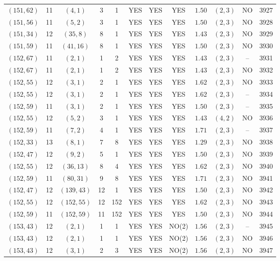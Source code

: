 \begin{longtable}{|c|c|c|c|c|c|c|c|c|c|c|c|}
$(151,62)$ & 11 & $(4,1)$ & 3 & 1 & YES & YES & YES & $1.50$ & $(2,3)$ & NO & 3927\\
$(151,56)$ & 11 & $(5,2)$ & 3 & 1 & YES & YES & YES & $1.50$ & $(2,3)$ & NO & 3928\\
$(151,34)$ & 12 & $(35,8)$ & 8 & 1 & YES & YES & YES & $1.43$ & $(2,3)$ & NO & 3929\\
$(151,59)$ & 11 & $(41,16)$ & 8 & 1 & YES & YES & YES & $1.50$ & $(2,3)$ & NO & 3930\\
$(152,67)$ & 11 & $(2,1)$ & 1 & 2 & YES & YES & YES & $1.43$ & $(2,3)$ & -- & 3931\\
$(152,67)$ & 11 & $(2,1)$ & 1 & 2 & YES & YES & YES & $1.43$ & $(2,3)$ & NO & 3932\\
$(152,55)$ & 12 & $(3,1)$ & 2 & 1 & YES & YES & YES & $1.62$ & $(2,3)$ & NO & 3933\\
$(152,55)$ & 12 & $(3,1)$ & 2 & 1 & YES & YES & YES & $1.62$ & $(2,3)$ & -- & 3934\\
$(152,59)$ & 11 & $(3,1)$ & 2 & 1 & YES & YES & YES & $1.50$ & $(2,3)$ & -- & 3935\\
$(152,55)$ & 12 & $(5,2)$ & 3 & 1 & YES & YES & YES & $1.43$ & $(4,2)$ & NO & 3936\\
$(152,59)$ & 11 & $(7,2)$ & 4 & 1 & YES & YES & YES & $1.71$ & $(2,3)$ & -- & 3937\\
$(152,33)$ & 13 & $(8,1)$ & 7 & 8 & YES & YES & YES & $1.29$ & $(2,3)$ & NO & 3938\\
$(152,47)$ & 12 & $(9,2)$ & 5 & 1 & YES & YES & YES & $1.50$ & $(2,3)$ & NO & 3939\\
$(152,55)$ & 12 & $(36,13)$ & 8 & 4 & YES & YES & YES & $1.62$ & $(2,3)$ & NO & 3940\\
$(152,59)$ & 11 & $(80,31)$ & 9 & 8 & YES & YES & YES & $1.71$ & $(2,3)$ & NO & 3941\\
$(152,47)$ & 12 & $(139,43)$ & 12 & 1 & YES & YES & YES & $1.50$ & $(2,3)$ & NO & 3942\\
$(152,55)$ & 12 & $(152,55)$ & 12 & 152 & YES & YES & YES & $1.62$ & $(2,3)$ & NO & 3943\\
$(152,59)$ & 11 & $(152,59)$ & 11 & 152 & YES & YES & YES & $1.50$ & $(2,3)$ & NO & 3944\\
$(153,43)$ & 12 & $(2,1)$ & 1 & 1 & YES & YES & NO(2) & $1.56$ & $(2,3)$ & -- & 3945\\
$(153,43)$ & 12 & $(2,1)$ & 1 & 1 & YES & YES & NO(2) & $1.56$ & $(2,3)$ & NO & 3946\\
$(153,43)$ & 12 & $(3,1)$ & 2 & 3 & YES & YES & NO(2) & $1.56$ & $(2,3)$ & NO & 3947\\

\end{longtable}
